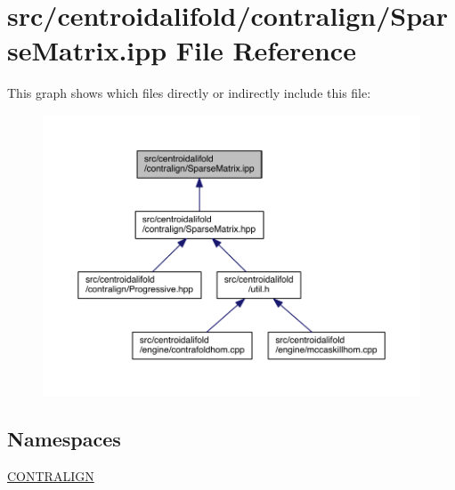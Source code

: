\hypertarget{_sparse_matrix_8ipp}{\section{src/centroidalifold/contralign/\+Sparse\+Matrix.ipp File Reference}
\label{_sparse_matrix_8ipp}
}
This graph shows which files directly or indirectly include this file\+:
\nopagebreak
\begin{figure}[H]
\begin{center}
\leavevmode
\includegraphics[width=350pt]{_sparse_matrix_8ipp__dep__incl}
\end{center}
\end{figure}
\subsection*{Namespaces}
\begin{DoxyCompactItemize}
\item 
 \hyperlink{namespace_c_o_n_t_r_a_l_i_g_n}{C\+O\+N\+T\+R\+A\+L\+I\+G\+N}
\end{DoxyCompactItemize}
